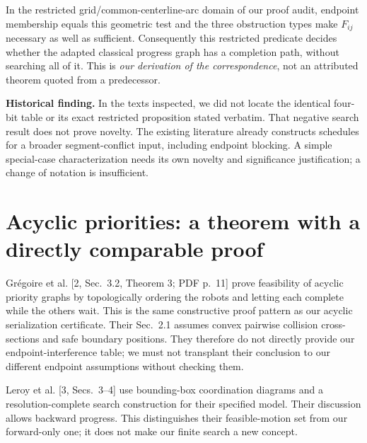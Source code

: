 \documentclass[11pt,a4paper]{article}
\begin{document}
In the restricted grid/common-centerline-arc domain of our proof audit,
endpoint membership equals this geometric test and the three obstruction types
make $F_{ij}$ necessary as well as sufficient. Consequently this restricted
predicate decides whether the adapted classical progress graph has a completion
path, without searching all of it. This is \emph{our derivation of the
correspondence}, not an attributed theorem quoted from a predecessor.

\textbf{Historical finding.} In the texts inspected, we did not locate the
identical four-bit table or its exact restricted proposition stated verbatim.
That negative search result does not prove novelty. The existing literature
already constructs schedules for a broader segment-conflict input, including
endpoint blocking. A simple special-case characterization needs its own
novelty and significance justification; a change of notation is insufficient.

\section{Acyclic priorities: a theorem with a directly comparable proof}
Gr\'egoire et al. [2, Sec.~3.2, Theorem 3; PDF p.~11] prove feasibility of
acyclic priority graphs by topologically ordering the robots and letting each
complete while the others wait. This is the same constructive proof pattern as
our acyclic serialization certificate. Their Sec.~2.1 assumes convex pairwise
collision cross-sections and safe boundary positions. They therefore do not
directly provide our endpoint-interference table; we must not transplant their
conclusion to our different endpoint assumptions without checking them.

Leroy et al. [3, Secs.~3--4] use bounding-box coordination diagrams and a
resolution-complete search construction for their specified model. Their
discussion allows backward progress. This distinguishes their feasible-motion
set from our forward-only one; it does not make our finite search a new concept.

\clearpage
\end{document}
